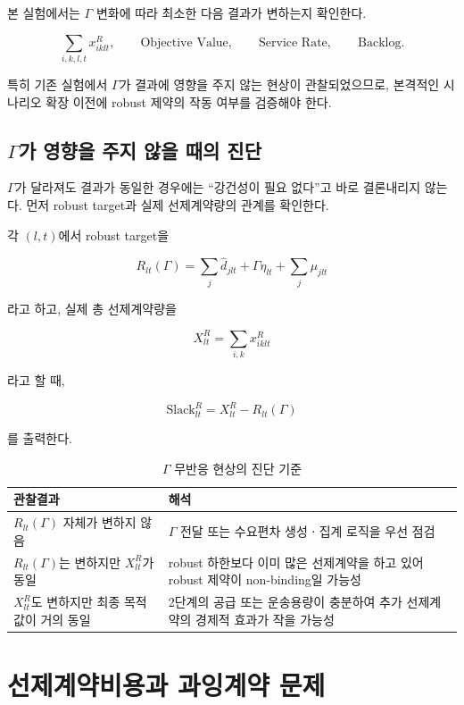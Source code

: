 \documentclass[11pt,a4paper]{article}
\begin{document}
본 실험에서는 $\Gamma$ 변화에 따라 최소한 다음 결과가 변하는지 확인한다.

\[
\sum_{i,k,l,t}x^R_{iklt}, \qquad
\text{Objective Value}, \qquad
\text{Service Rate}, \qquad
\text{Backlog}.
\]

특히 기존 실험에서 $\Gamma$가 결과에 영향을 주지 않는 현상이 관찰되었으므로,
본격적인 시나리오 확장 이전에 robust 제약의 작동 여부를 검증해야 한다.

\subsection{$\Gamma$가 영향을 주지 않을 때의 진단}

$\Gamma$가 달라져도 결과가 동일한 경우에는
``강건성이 필요 없다''고 바로 결론내리지 않는다.
먼저 robust target과 실제 선제계약량의 관계를 확인한다.

각 $(l,t)$에서 robust target을

\[
R_{lt}(\Gamma)
=
\sum_j \hat d_{jlt}
+
\Gamma\eta_{lt}
+
\sum_j\mu_{jlt}
\]

라고 하고, 실제 총 선제계약량을

\[
X^R_{lt}=\sum_{i,k}x^R_{iklt}
\]

라고 할 때,

\[
\mathrm{Slack}^{R}_{lt}
=
X^R_{lt}-R_{lt}(\Gamma)
\]

를 출력한다.

\begin{table}[h!]
\centering
\caption{$\Gamma$ 무반응 현상의 진단 기준}
\begin{tabular}{p{}p{}}
\toprule
\textbf{관찰결과} & \textbf{해석} \\
\midrule
$R_{lt}(\Gamma)$ 자체가 변하지 않음 & $\Gamma$ 전달 또는 수요편차 생성ㆍ집계 로직을 우선 점검 \\
$R_{lt}(\Gamma)$는 변하지만 $X^R_{lt}$가 동일 & robust 하한보다 이미 많은 선제계약을 하고 있어 robust 제약이 non-binding일 가능성 \\
$X^R_{lt}$도 변하지만 최종 목적값이 거의 동일 & 2단계의 공급 또는 운송용량이 충분하여 추가 선제계약의 경제적 효과가 작을 가능성 \\
\bottomrule
\end{tabular}
\end{table}

\section{선제계약비용과 과잉계약 문제}
\end{document}
